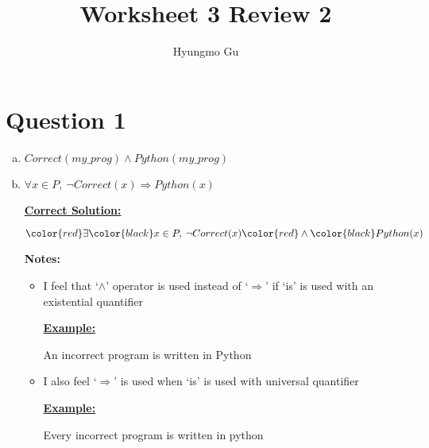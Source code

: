 \documentclass[12pt]{article}
\begin{document}
\title{Worksheet 3 Review 2}
\author{Hyungmo Gu}
\maketitle

\section*{Question 1}
\begin{enumerate}[a.]
    \item $Correct(my\_prog) \land Python(my\_prog)$
    \item

    $\forall x \in P,\: \neg Correct(x) \Rightarrow Python(x)$

    \begin{mdframed}
        \underline{\textbf{Correct Solution:}}

        \bigskip

        $\color{red}\exists\color{black} x \in P,\: \neg Correct(x) \color{red}\land\color{black} Python(x)$
    \end{mdframed}

    \bigskip

    \textbf{Notes:}

    \begin{itemize}
        \item I feel that `$\land$' operator is used instead of `$\Rightarrow$'
        if `is' is used with an existential quantifier

        \bigskip

        \begin{mdframed}
            \underline{\textbf{Example:}}

            \bigskip

           An incorrect program is written in Python
        \end{mdframed}

        \item I also feel `$\Rightarrow$' is used when `is' is used with universal
        quantifier

        \bigskip

        \begin{mdframed}
            \underline{\textbf{Example:}}

            \bigskip

           Every incorrect program is written in python
        \end{mdframed}
    \end{itemize}


\end{enumerate}
\end{document}
